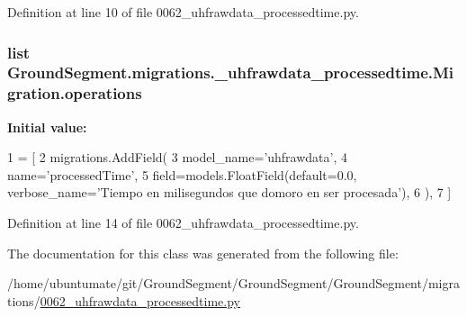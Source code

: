 Definition at line 10 of file 0062\+\_\+uhfrawdata\+\_\+processedtime.\+py.

\hypertarget{class_ground_segment_1_1migrations_1_10062__uhfrawdata__processedtime_1_1_migration_a73b5ad595e2671c050deeea914ec0daf}{}
\subsubsection[{operations}]{\setlength{\rightskip}{0pt plus 5cm}list Ground\+Segment.\+migrations.\+\_\+uhfrawdata\+\_\+processedtime.\+Migration.\+operations\hspace{0.3cm}{\ttfamily [static]}}\label{class_ground_segment_1_1migrations_1_10062__uhfrawdata__processedtime_1_1_migration_a73b5ad595e2671c050deeea914ec0daf}
{\bfseries Initial value\+:}
\begin{DoxyCode}
1 = [
2         migrations.AddField(
3             model\_name=\textcolor{stringliteral}{'uhfrawdata'},
4             name=\textcolor{stringliteral}{'processedTime'},
5             field=models.FloatField(default=0.0, verbose\_name=\textcolor{stringliteral}{'Tiempo en milisegundos que domoro en ser
       procesada'}),
6         ),
7     ]
\end{DoxyCode}


Definition at line 14 of file 0062\+\_\+uhfrawdata\+\_\+processedtime.\+py.



The documentation for this class was generated from the following file\+:\begin{DoxyCompactItemize}
\item 
/home/ubuntumate/git/\+Ground\+Segment/\+Ground\+Segment/\+Ground\+Segment/migrations/\hyperlink{0062__uhfrawdata__processedtime_8py}{0062\+\_\+uhfrawdata\+\_\+processedtime.\+py}\end{DoxyCompactItemize}
